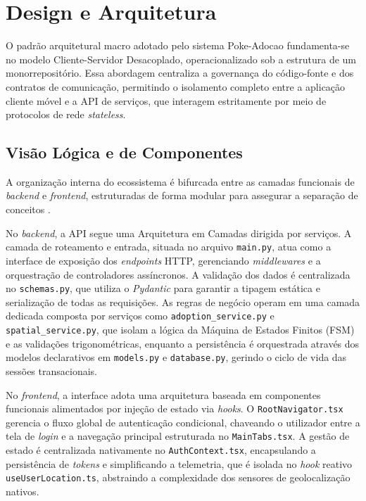 \chapter{Design e Arquitetura}

O padrão arquitetural macro adotado pelo sistema Poke-Adocao fundamenta-se no modelo Cliente-Servidor Desacoplado, operacionalizado sob a estrutura de um monorrepositório. Essa abordagem centraliza a governança do código-fonte e dos contratos de comunicação, permitindo o isolamento completo entre a aplicação cliente móvel e a API de serviços, que interagem estritamente por meio de protocolos de rede \textit{stateless}.

\section{Visão Lógica e de Componentes}

A organização interna do ecossistema é bifurcada entre as camadas funcionais de \textit{backend} e \textit{frontend}, estruturadas de forma modular para assegurar a separação de conceitos \cite{sommerville2011software}. 

No \textit{backend}, a API segue uma Arquitetura em Camadas dirigida por serviços. A camada de roteamento e entrada, situada no arquivo \texttt{main.py}, atua como a interface de exposição dos \textit{endpoints} HTTP, gerenciando \textit{middlewares} e a orquestração de controladores assíncronos. A validação dos dados é centralizada no \texttt{schemas.py}, que utiliza o \textit{Pydantic} para garantir a tipagem estática e serialização de todas as requisições. As regras de negócio operam em uma camada dedicada composta por serviços como \texttt{adoption\_service.py} e \texttt{spatial\_service.py}, que isolam a lógica da Máquina de Estados Finitos (FSM) e as validações trigonométricas, enquanto a persistência é orquestrada através dos modelos declarativos em \texttt{models.py} e \texttt{database.py}, gerindo o ciclo de vida das sessões transacionais.

No \textit{frontend}, a interface adota uma arquitetura baseada em componentes funcionais alimentados por injeção de estado via \textit{hooks}. O \texttt{RootNavigator.tsx} gerencia o fluxo global de autenticação condicional, chaveando o utilizador entre a tela de \textit{login} e a navegação principal estruturada no \texttt{MainTabs.tsx}. A gestão de estado é centralizada nativamente no \texttt{AuthContext.tsx}, encapsulando a persistência de \textit{tokens} e simplificando a telemetria, que é isolada no \textit{hook} reativo \texttt{useUserLocation.ts}, abstraindo a complexidade dos sensores de geolocalização nativos.

